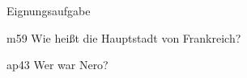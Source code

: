\documentclass[11pt,ka]{teacher}
\begin{document}
\begin{aufgabe}[Mathe]{Eignungsaufgabe}
\begin{teilaufgabe}{m}{5}{9} \liniert
    Wie heißt die Hauptstadt von Frankreich?
\end{teilaufgabe}
    \begin{loesung}
    \end{loesung}
\begin{teilaufgabe}{ap}{4}{3} \kariert
    Wer war Nero?
\end{teilaufgabe}
    \begin{loesung}
    \end{loesung}
\end{aufgabe}







\end{document}
